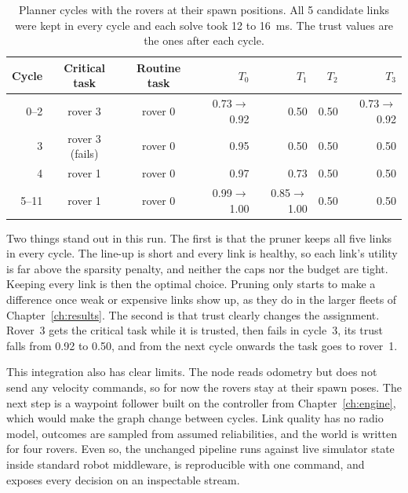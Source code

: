 \begin{table}[htbp]
\centering
\caption[Planner cycles with the rovers at their spawn positions.]{Planner cycles with the rovers at their spawn positions. All 5
candidate links were kept in every cycle and each solve took 12 to 16~ms. The
trust values are the ones after each cycle.}
\label{tab:gz:run}
\small
\begin{tabular}{@{}r c c r r r r@{}}
\toprule
Cycle & Critical task & Routine task & $T_0$ & $T_1$ & $T_2$ & $T_3$ \\
\midrule
0--2 & rover 3 & rover 0 & 0.73$\to$0.92 & 0.50 & 0.50 & 0.73$\to$0.92 \\
3 & rover 3 (fails) & rover 0 & 0.95 & 0.50 & 0.50 & 0.50 \\
4 & rover 1 & rover 0 & 0.97 & 0.73 & 0.50 & 0.50 \\
5--11 & rover 1 & rover 0 & 0.99$\to$1.00 & 0.85$\to$1.00 & 0.50 & 0.50 \\
\bottomrule
\end{tabular}
\end{table}

Two things stand out in this run. The first is that the pruner keeps all five
links in every cycle. The line-up is short and every link is healthy, so each
link's utility is far above the sparsity penalty, and neither the caps nor the
budget are tight. Keeping every link is then the optimal choice. Pruning only
starts to make a difference once weak or expensive links show up, as they do
in the larger fleets of Chapter~\ref{ch:results}. The second is that trust
clearly changes the assignment. Rover~3 gets the critical task while it is
trusted, then fails in cycle~3, its trust falls from 0.92 to 0.50, and from the
next cycle onwards the task goes to rover~1.

This integration also has clear limits. The node reads odometry but does not
send any velocity commands, so for now the rovers stay at their spawn poses.
The next step is a waypoint follower built on the controller from
Chapter~\ref{ch:engine}, which would make the graph change between
cycles. Link quality has no radio model, outcomes are sampled from
assumed reliabilities, and the world is written for four rovers. Even so, the
unchanged pipeline runs against live simulator state inside standard robot
middleware, is reproducible with one command, and exposes every decision on an
inspectable stream.

